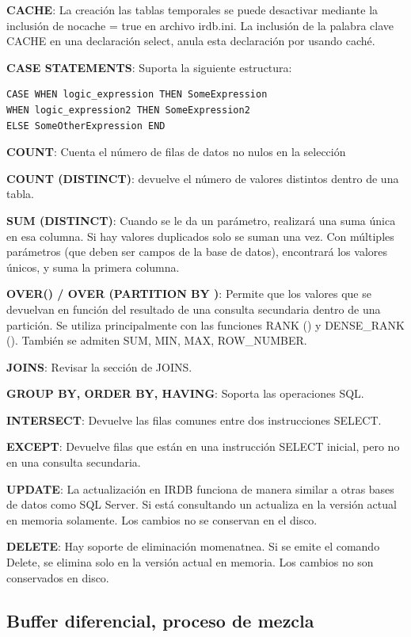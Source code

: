 \documentclass{acmart}
\begin{document}
\textbf{CACHE}: La creación las tablas temporales se puede desactivar mediante la inclusión de nocache = true en
archivo irdb.ini. La inclusión de la palabra clave CACHE en una declaración select, anula esta declaración por
usando caché.

\textbf{CASE STATEMENTS}: Suporta la siguiente estructura:
\begin{verbatim}
CASE WHEN logic_expression THEN SomeExpression
WHEN logic_expression2 THEN SomeExpression2
ELSE SomeOtherExpression END
\end{verbatim}

\textbf{COUNT}: Cuenta el número de filas de datos no nulos en la selección

\textbf{COUNT (DISTINCT)}: devuelve el número de valores distintos dentro de una tabla.

\textbf{SUM (DISTINCT)}: Cuando se le da un parámetro, realizará una suma única en esa columna. Si hay
valores duplicados solo se suman una vez. Con múltiples parámetros (que deben ser campos de la base de datos), encontrará los valores únicos, y suma la primera columna.

\textbf{OVER() / OVER (PARTITION BY )}: Permite que los valores que se devuelvan en función del resultado de una consulta secundaria dentro de una partición. Se utiliza principalmente con las funciones RANK () y DENSE\_RANK (). También se admiten SUM, MIN, MAX, ROW\_NUMBER.

\textbf{JOINS}: Revisar la sección de JOINS.

\textbf{GROUP BY, ORDER BY, HAVING}: Soporta las operaciones SQL.

\textbf{INTERSECT}: Devuelve las filas comunes entre dos instrucciones SELECT.

\textbf{EXCEPT}: Devuelve filas que están en una instrucción SELECT inicial, pero no en una consulta secundaria.

\textbf{UPDATE}: La actualización en IRDB funciona de manera similar a otras bases de datos como SQL Server. Si está consultando un actualiza en la versión actual en memoria solamente. Los cambios no se conservan en el disco.

\textbf{DELETE}: Hay soporte de eliminación momenatnea. Si se emite el comando Delete, se elimina solo en la versión actual en memoria. Los cambios no son conservados en disco.

\subsection{Buffer diferencial, proceso de mezcla}
\end{document}
